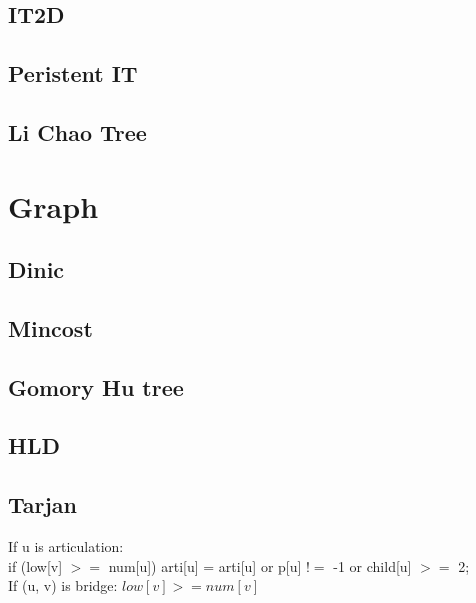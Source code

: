 \documentclass[a4paper, 12pt, oneside, landscape]{article}
\begin{document}
\begin{multicols}{2}
% 	
	
	\subsection{IT2D}
	
	
	\subsection{Peristent IT}
	
	
	\subsection{Li Chao Tree}
	

\section{Graph}
	\subsection{Dinic}
	

	\subsection{Mincost}
	
	
	\subsection{Gomory Hu tree}
	
	
	\subsection{HLD}
	
	
	\subsection{Tarjan}
If u is articulation: \\
if (low[v] $>=$ num[u]) arti[u] = arti[u] or p[u] $!=$ -1 or child[u] $>=$ 2; \\
If (u, v) is bridge: $low[v] >= num[v]$

\end{multicols}
\end{document}

